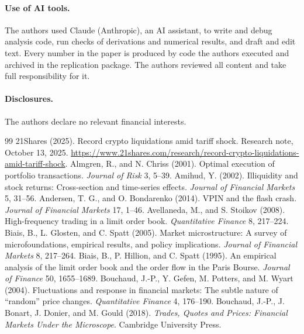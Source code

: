 \documentclass[12pt]{article}
\theoremstyle{definition}
\theoremstyle{remark}
\begin{document}
\paragraph{Use of AI tools.} The authors used Claude (Anthropic), an AI assistant, to write and debug analysis code, run checks of derivations and numerical results, and draft and edit text. Every number in the paper is produced by code the authors executed and archived in the replication package. The authors reviewed all content and take full responsibility for it.

\paragraph{Disclosures.} The authors declare no relevant financial interests.
\begin{thebibliography}{99}\setlength{\itemsep}{2pt}\small
{} 21Shares (2025). Record crypto liquidations amid tariff shock. Research note, October 13, 2025. \url{https://www.21shares.com/research/record-crypto-liquidations-amid-tariff-shock}.
 Almgren, R., and N. Chriss (2001). Optimal execution of portfolio transactions. \emph{Journal of Risk} 3, 5--39.
 Amihud, Y. (2002). Illiquidity and stock returns: Cross-section and time-series effects. \emph{Journal of Financial Markets} 5, 31--56.
 Andersen, T. G., and O. Bondarenko (2014). VPIN and the flash crash. \emph{Journal of Financial Markets} 17, 1--46.
 Avellaneda, M., and S. Stoikov (2008). High-frequency trading in a limit order book. \emph{Quantitative Finance} 8, 217--224.
 Biais, B., L. Glosten, and C. Spatt (2005). Market microstructure: A survey of microfoundations, empirical results, and policy implications. \emph{Journal of Financial Markets} 8, 217--264.
 Biais, B., P. Hillion, and C. Spatt (1995). An empirical analysis of the limit order book and the order flow in the Paris Bourse. \emph{Journal of Finance} 50, 1655--1689.
 Bouchaud, J.-P., Y. Gefen, M. Potters, and M. Wyart (2004). Fluctuations and response in financial markets: The subtle nature of ``random'' price changes. \emph{Quantitative Finance} 4, 176--190.
 Bouchaud, J.-P., J. Bonart, J. Donier, and M. Gould (2018). \emph{Trades, Quotes and Prices: Financial Markets Under the Microscope}. Cambridge University Press.

\end{thebibliography}
\end{document}
